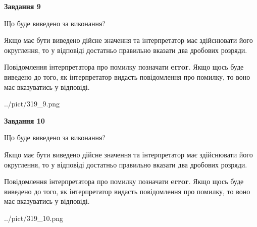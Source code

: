 \documentclass[12pt, ukrainian]{article}
\begin{document}
{\begin {Large}
{\begin {center}\textbf{Завдання 9}\end {center}}\par
Що буде виведено за виконання? \par

Якщо має бути виведено дійсне значення та інтерпретатор має здійснювати його округлення, 
то у відповіді достатньо правильно вказати два дробових розряди.

Повідомлення інтерпретатора про помилку позначати \textbf{error}.
Якщо щось буде виведено до того, як інтерпретатор видасть повідомлення про помилку, 
то воно має вказуватись у відповіді. \par

\begin{center}
	{../pict/319_9.png}
\end{center}
\newpage

{\begin {center}\textbf{Завдання 10}\end {center}}\par
Що буде виведено за виконання? \par

Якщо має бути виведено дійсне значення та інтерпретатор має здійснювати його округлення, 
то у відповіді достатньо правильно вказати два дробових розряди.

Повідомлення інтерпретатора про помилку позначати \textbf{error}.
Якщо щось буде виведено до того, як інтерпретатор видасть повідомлення про помилку, 
то воно має вказуватись у відповіді. \par

\begin{center}
	{../pict/319_10.png}
\end{center}
\newpage

\end {Large}}
\end{document}

